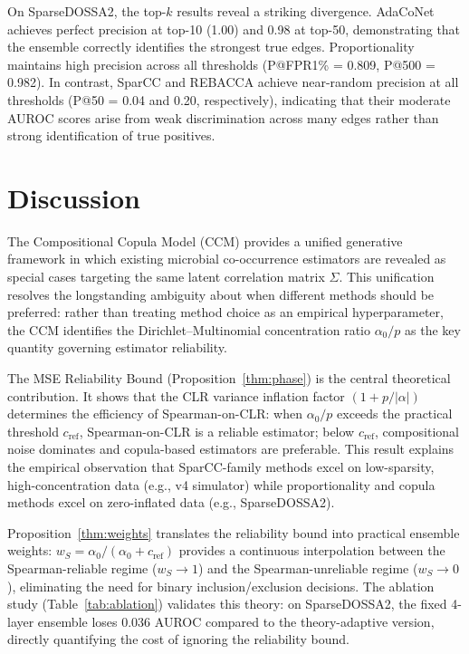 \documentclass[unnumsec,webpdf,contemporary,large,numbered]{oup-authoring-template}
\theoremstyle{plain}
\theoremstyle{definition}
\begin{document}
On SparseDOSSA2, the top-$k$ results reveal a striking divergence. AdaCoNet achieves perfect precision at top-10 (1.00) and 0.98 at top-50, demonstrating that the ensemble correctly identifies the strongest true edges. Proportionality maintains high precision across all thresholds (P@FPR1\% = 0.809, P@500 = 0.982). In contrast, SparCC and REBACCA achieve near-random precision at all thresholds (P@50 = 0.04 and 0.20, respectively), indicating that their moderate AUROC scores arise from weak discrimination across many edges rather than strong identification of true positives.


\section{Discussion}\label{sec:discuss}

The Compositional Copula Model (CCM) provides a unified generative framework in which existing microbial co-occurrence estimators are revealed as special cases targeting the same latent correlation matrix $\Sigma$. This unification resolves the longstanding ambiguity about when different methods should be preferred: rather than treating method choice as an empirical hyperparameter, the CCM identifies the Dirichlet--Multinomial concentration ratio $\alpha_0/p$ as the key quantity governing estimator reliability.

The MSE Reliability Bound (Proposition~\ref{thm:phase}) is the central theoretical contribution. It shows that the CLR variance inflation factor $(1 + p/|\alpha|)$ determines the efficiency of Spearman-on-CLR: when $\alpha_0/p$ exceeds the practical threshold $c_{\text{ref}}$, Spearman-on-CLR is a reliable estimator; below $c_{\text{ref}}$, compositional noise dominates and copula-based estimators are preferable. This result explains the empirical observation that SparCC-family methods excel on low-sparsity, high-concentration data (e.g., v4 simulator) while proportionality and copula methods excel on zero-inflated data (e.g., SparseDOSSA2).

Proposition~\ref{thm:weights} translates the reliability bound into practical ensemble weights: $w_S = \alpha_0/(\alpha_0 + c_{\text{ref}})$ provides a continuous interpolation between the Spearman-reliable regime ($w_S \to 1$) and the Spearman-unreliable regime ($w_S \to 0$), eliminating the need for binary inclusion/exclusion decisions. The ablation study (Table~\ref{tab:ablation}) validates this theory: on SparseDOSSA2, the fixed 4-layer ensemble loses 0.036 AUROC compared to the theory-adaptive version, directly quantifying the cost of ignoring the reliability bound.
\end{document}
